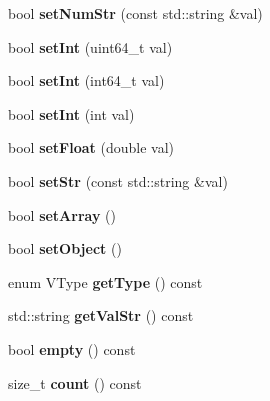 \begin{DoxyCompactItemize}
bool {\bfseries set\+Num\+Str} (const std\+::string \&val)
\item 
\mbox{\label{class_uni_value_a9b2df9e0db0d6370fd59783a7942af91}} 
bool {\bfseries set\+Int} (uint64\+\_\+t val)
\item 
\mbox{\label{class_uni_value_a9b075d0074d27b123cc5b5373865f06d}} 
bool {\bfseries set\+Int} (int64\+\_\+t val)
\item 
\mbox{\label{class_uni_value_a20c2ec916384bcb48b5f2aa50b6a2f86}} 
bool {\bfseries set\+Int} (int val)
\item 
\mbox{\label{class_uni_value_af887f08e539e589accea7beebd51eaae}} 
bool {\bfseries set\+Float} (double val)
\item 
\mbox{\label{class_uni_value_ac20022e977498c332838daf4bf4f0948}} 
bool {\bfseries set\+Str} (const std\+::string \&val)
\item 
\mbox{\label{class_uni_value_a00c402e60dbabcf3b4ea4246552bcacb}} 
bool {\bfseries set\+Array} ()
\item 
\mbox{\label{class_uni_value_a0894e98fb8db031d2477c70147e0fd18}} 
bool {\bfseries set\+Object} ()
\item 
\mbox{\label{class_uni_value_a2dbc9c5aa9d209338b0bef650f3d1987}} 
enum V\+Type {\bfseries get\+Type} () const
\item 
\mbox{\label{class_uni_value_a1ba51ca39c6f650c34348f2b09c05a9d}} 
std\+::string {\bfseries get\+Val\+Str} () const
\item 
\mbox{\label{class_uni_value_a6cf106f8b73c526b50d0c77a36a2d8ec}} 
bool {\bfseries empty} () const
\item 
\mbox{\label{class_uni_value_aa48fd173d2432fb441977e470682207b}} 
size\+\_\+t {\bfseries count} () const
\item 
\mbox{\label{class_uni_value_acb5c848d20cb741dbe65e28bc513baa8}} 

\end{DoxyCompactItemize}
